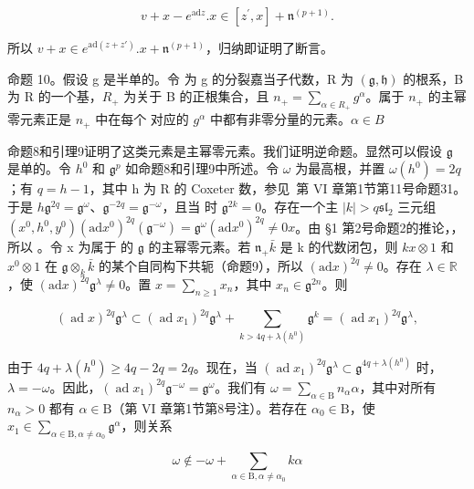 \[
v + x - e ^ {\mathrm{ad} z}. x \in [ z ^ {\prime}, x ] + \mathfrak {n} ^ {(p + 1)}.
\]

所以 \(v + x \in e^{\mathrm{ad}(z + z')}.x + \mathfrak{n}^{(p + 1)}\)，归纳即证明了断言。

命题 10。假设 g 是半单的。令  为 g 的分裂嘉当子代数，R 为 \((\mathfrak{g},\mathfrak{h})\) 的根系，B 为 R 的一个基，\(R_{+}\) 为关于 B 的正根集合，且 \(n_{+}=\sum_{\alpha\in R_{+}}g^{\alpha}\)。属于 \(n_{+}\) 的主幂零元素正是 \(n_{+}\) 中在每个  对应的 \(g^{\alpha}\) 中都有非零分量的元素。\(\alpha\in B\)

命题8和引理9证明了这类元素是主幂零元素。我们证明逆命题。显然可以假设 \(\mathfrak{g}\) 是单的。令 \(h^0\) 和 \(\mathfrak{g}^p\) 如命题8和引理9中所述。令 \(\omega\) 为最高根，并置 \(\omega(h^0) = 2q\)；有 \(q = h - 1\)，其中 h 为 R 的 Coxeter 数，参见~第 VI 章第1节第11号命题31。于是 \(h\)\(\mathfrak{g}^{2q} = \mathfrak{g}^\omega\)、\(\mathfrak{g}^{-2q} = \mathfrak{g}^{-\omega}\)，且当  时 \(\mathfrak{g}^{2k} = 0\)。存在一个主 \(|k| > q\)\(\mathfrak{sl}_2\) 三元组 \((x^0, h^0, y^0)\)\((\mathrm{ad} x^0)^{2q}(\mathfrak{g}^{-\omega}) = \mathfrak{g}^\omega\)\((\mathrm{ad} x^0)^{2q} \neq 0\)\(x\)。由 §1 第2号命题2的推论，，所以 。令 x 为属于  的 \(\mathfrak{g}\) 的主幂零元素。若 \(\mathfrak{n}_+\)\(\bar{k}\) 是 k 的代数闭包，则 \(k\)\(x \otimes 1\) 和 \(x^0 \otimes 1\) 在 \(\mathfrak{g} \otimes_k \bar{k}\) 的某个自同构下共轭（命题9），所以 \((\mathrm{ad} x)^{2q} \neq 0\)。存在 \(\lambda \in \mathbb{R}\)，使 \((\mathrm{ad} x)^{2q} \mathfrak{g}^\lambda \neq 0\)。置 \(x = \sum_{n \geq 1} x_n\)，其中 \(x_n \in \mathfrak{g}^{2n}\)。则

\[
(\operatorname{ad} x) ^ {2 q} \mathfrak {g} ^ {\lambda} \subset (\operatorname{ad} x _ {1}) ^ {2 q} \mathfrak {g} ^ {\lambda} + \sum_ {k > 4 q + \lambda (h ^ {0})} \mathfrak {g} ^ {k} = (\operatorname{ad} x _ {1}) ^ {2 q} \mathfrak {g} ^ {\lambda},
\]

由于 \(4q + \lambda(h^0) \geq 4q - 2q = 2q\)。现在，当 \((\operatorname{ad} x_1)^{2q} \mathfrak{g}^\lambda \subset \mathfrak{g}^{4q + \lambda(h^0)}\) 时，\(\lambda = -\omega\)。因此，\((\operatorname{ad} x_1)^{2q} \mathfrak{g}^{-\omega} = \mathfrak{g}^\omega\)。我们有 \(\omega = \sum_{\alpha \in \mathrm{B}} n_\alpha \alpha\)，其中对所有 \(n_\alpha > 0\) 都有 \(\alpha \in \mathrm{B}\)（第 VI 章第1节第8号注）。若存在 \(\alpha_0 \in \mathrm{B}\)，使 \(x_1 \in \sum_{\alpha \in \mathrm{B}, \alpha \neq \alpha_0} \mathfrak{g}^\alpha\)，则关系

\[
\omega \notin - \omega + \sum_ {\alpha \in \mathrm{B}, \alpha \neq \alpha_ {0}} k \alpha
\]

